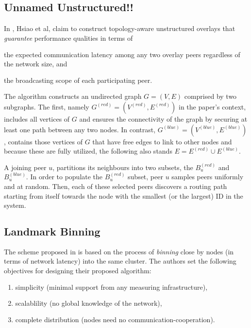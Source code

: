 \documentclass[a4paper,10pt]{article}
\begin{document}
\subsection{Unnamed Unstructured!!}

\paragraph{}
In \cite{hsiao_redblue_2009}, Hsiao et al, claim to construct topology-aware unstructured overlays that \emph{guarantee} performance qualities in terms of
\begin{inparaenum}
  \item the expected communication latency among any two overlay peers regardless of the network size, and
  \item the broadcasting scope of each participating peer.
\end{inparaenum}

The algorithm constructs an undirected graph $G = \left( V, E \right)$ comprised by two subgraphs. The first, namely $G^{\left( red \right)} = \left( V^{\left( red \right)}, E^{\left( red \right)} \right)$ in the paper's context, includes all vertices of $G$ and ensures the connectivity of the graph by securing at least one path between any two nodes. In contrast, $G^{\left( blue \right)} = \left( V^{\left( blue \right)}, E^{\left( blue \right)} \right)$, contains those vertices of $G$ that have free edges to link to other nodes and because these are fully utilized, the following also stands $E = E^{\left( red \right)} \cup E^{\left( blue \right)}$.

A joining peer $u$, partitions its neighbours into two subsets, the $B_u^{\left( red \right)}$ and $B_u^{\left( blue \right)}$. In order to populate the $B_u^{\left( red \right)}$ subset, peer $u$ samples peers uniformly and at random. Then, each of these selected peers discovers a routing path starting from itself towards the node with the smallest (or the largest) ID in the system.


\subsection{Landmark Binning}
The scheme proposed in \cite{ratnasamy_binning_2002} is based on the process of \emph{binning} close by nodes (in terms of network latency) into the same cluster. The authors set the following objectives for designing their proposed algorithm:
\begin{enumerate}
 \item simplicity (minimal support from any measuring infrastructure),
 \item scalablility (no global knowledge of the network),
 \item complete distribution (nodes need no communication-cooperation).
\end{enumerate}
\end{document}
